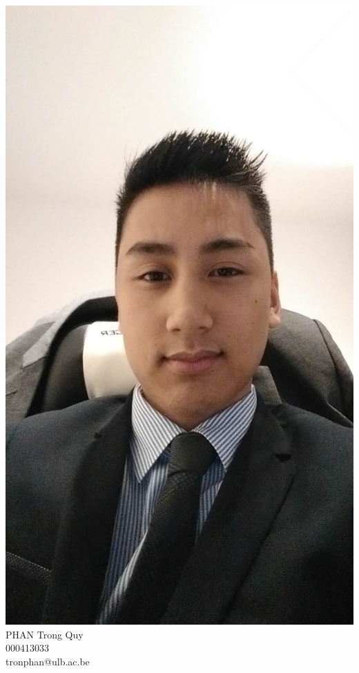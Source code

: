 \documentclass[12pt]{report}
\begin{document}
            \begin{minipage}{0.4\textwidth}
            \begin{center} \large
            \includegraphics[scale=0.08]{Quy.jpg}\\
            \small PHAN Trong Quy\\                             
            \small 000413033\\
            \small tronphan@ulb.ac.be
        \end{center}
    \end{minipage}
\end{document}
